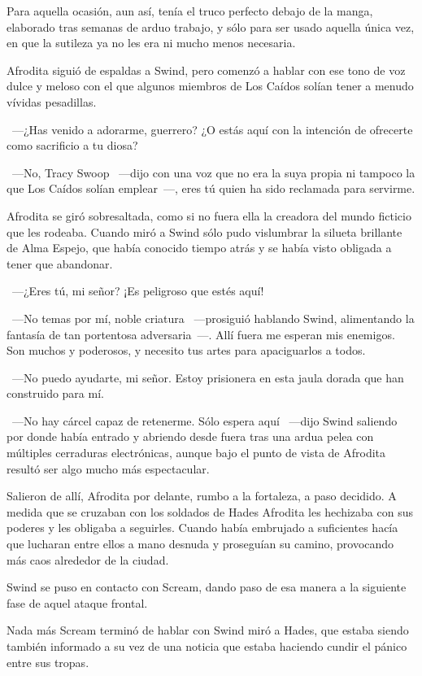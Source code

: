 Para aquella ocasión, aun así, tenía el truco perfecto debajo de la manga, elaborado tras semanas de arduo trabajo, y sólo para ser usado aquella única vez, en que la sutileza ya no les era ni mucho menos necesaria.

Afrodita siguió de espaldas a Swind, pero comenzó a hablar con ese tono de voz dulce y meloso con el que algunos miembros de Los Caídos solían tener a menudo vívidas pesadillas.

~---¿Has venido a adorarme, guerrero? ¿O estás aquí con la intención de ofrecerte como sacrificio a tu diosa?

~---No, Tracy Swoop ~---dijo con una voz que no era la suya propia ni tampoco la que Los Caídos solían emplear~---, eres tú quien ha sido reclamada para servirme.

Afrodita se giró sobresaltada, como si no fuera ella la creadora del mundo ficticio que les rodeaba. Cuando miró a Swind sólo pudo vislumbrar la silueta brillante de Alma Espejo, que había conocido tiempo atrás y se había visto obligada a tener que abandonar.

~---¿Eres tú, mi señor? ¡Es peligroso que estés aquí!

~---No temas por mí, noble criatura ~---prosiguió hablando Swind, alimentando la fantasía de tan portentosa adversaria~---. Allí fuera me esperan mis enemigos. Son muchos y poderosos, y necesito tus artes para apaciguarlos a todos.

~---No puedo ayudarte, mi señor. Estoy prisionera en esta jaula dorada que han construido para mí.

~---No hay cárcel capaz de retenerme. Sólo espera aquí ~---dijo Swind saliendo por donde había entrado y abriendo desde fuera tras una ardua pelea con múltiples cerraduras electrónicas, aunque bajo el punto de vista de Afrodita resultó ser algo mucho más espectacular.

Salieron de allí, Afrodita por delante, rumbo a la fortaleza, a paso decidido. A medida que se cruzaban con los soldados de Hades Afrodita les hechizaba con sus poderes y les obligaba a seguirles. Cuando había embrujado a suficientes hacía que lucharan entre ellos a mano desnuda y proseguían su camino, provocando más caos alrededor de la ciudad.

Swind se puso en contacto con Scream, dando paso de esa manera a la siguiente fase de aquel ataque frontal.

\parbreak
Nada más Scream terminó de hablar con Swind miró a Hades, que estaba siendo también informado a su vez de una noticia que estaba haciendo cundir el pánico entre sus tropas.

